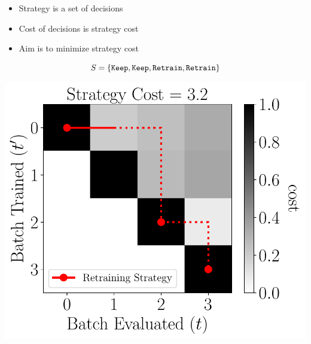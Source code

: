 \documentclass[pdf]{beamer}
\begin{document}
\begin{frame}[fragile]
\begin{tcbraster}[raster columns=2, raster left skip=-0.9cm,raster right skip=-0.9cm,raster before skip=0mm]
\begin{tcolorbox}[nobeforeafter, title=Strategy,boxsep=0.5mm,left=0mm]
\begin{itemize}
            \item Strategy is a set of decisions
            \item Cost of decisions is strategy cost
            \item Aim is to minimize strategy cost
        \end{itemize}
        $$S = \left\{\texttt{Keep},\texttt{Keep},\texttt{Retrain},\texttt{Retrain}\right\}$$
        \begin{center}
            \includegraphics[width=.78\textwidth]{figs/strategy.pdf}
            \end{center}
            \end{tcolorbox}
    \end{tcbraster}
\end{frame}
\end{document}
